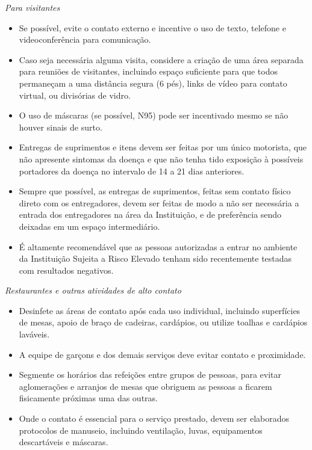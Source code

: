 \documentclass[onecolumn,journal]{IEEEtran}
\begin{document}
\begin{multicols}{2}
\textit{Para visitantes}

\begin{itemize}
\item Se possível, evite o contato externo e incentive o uso de texto, telefone e videoconferência para comunicação.
\item Caso seja necessária alguma visita, considere a criação de uma área separada para reuniões de visitantes, incluindo espaço suficiente para que todos permaneçam a uma distância segura (6 pés), links de vídeo para contato virtual, ou divisórias de vidro.
\item O uso de máscaras (se possível, N95) pode ser incentivado
mesmo se não houver sinais de surto.
\item Entregas de suprimentos e itens devem ser feitas por um único motorista, que não apresente sintomas da doença e que não tenha tido exposição à possíveis portadores da doença no intervalo de 14 a 21 dias anteriores.
\item Sempre que possível, as entregas de suprimentos, feitas sem contato físico direto com os entregadores, devem ser feitas de modo a não ser necessária a entrada dos entregadores na área da Instituição, e de preferência sendo deixadas em um espaço intermediário.
\item É altamente recomendável que as pessoas autorizadas a entrar no ambiente da Instituição Sujeita a Risco Elevado tenham sido recentemente testadas com resultados negativos.
\end{itemize}

\textit{Restaurantes e outras atividades de alto contato}
\begin{itemize}
\item Desinfete as áreas de contato após cada uso individual, incluindo superfícies de mesas, apoio de braço de cadeiras, cardápios, ou utilize toalhas e cardápios laváveis.
\item A equipe de garçons e dos demais serviços deve evitar contato e proximidade.
\item Segmente os horários das refeições entre grupos de pessoas, para evitar aglomerações e arranjos de mesas que obriguem as pessoas a ficarem fisicamente próximas uma das outras.
\item Onde o contato é essencial para o serviço prestado, devem ser elaborados protocolos de manuseio, incluindo ventilação, luvas, equipamentos descartáveis e máscaras.
\end{itemize}


\end{multicols}
\end{document}
